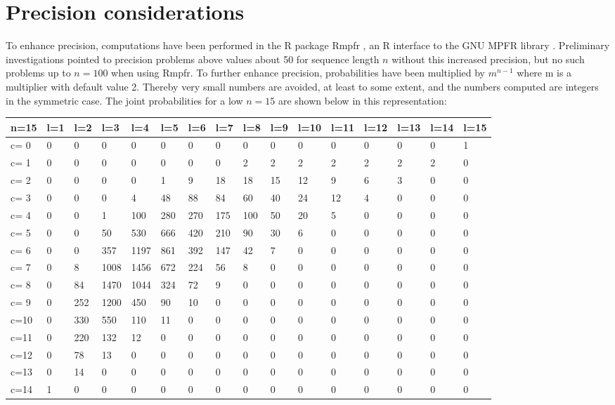 \section{Precision considerations}

To enhance precision, computations have been performed in the R package Rmpfr \citep{Rmpfr}, an R interface to the GNU MPFR library \citep{FouLHLPZ-2007}. Preliminary investigations pointed to precision problems above values about 50 for sequence length $n$ without this increased precision, but no such problems up to $n=100$ when using Rmpfr. To further enhance precision, probabilities have been multiplied by $m^{n-1}$ where m is a multiplier with default value 2. Thereby very small numbers are avoided, at least to some extent, and the numbers computed are integers in the symmetric case. The joint probabilities for a low $n=15$ are shown below in this representation:

\tiny{
\begin{tabular}{l | l l l l l l l l l l l l l l l}
\hline
n=15&l=1&l=2&l=3&l=4&l=5&l=6&l=7&l=8&l=9&l=10&l=11&l=12&l=13&l=14&l=15\\
\hline
c= 0& 0& 0& 0& 0& 0& 0& 0& 0& 0& 0& 0& 0& 0& 0& 1\\
c= 1& 0& 0& 0& 0& 0& 0& 0& 2& 2& 2& 2& 2& 2& 2& 0\\
c= 2& 0& 0& 0& 0& 1& 9& 18& 18& 15& 12& 9& 6& 3& 0& 0\\
c= 3& 0& 0& 0& 4& 48& 88& 84& 60& 40& 24& 12& 4& 0& 0& 0\\
c= 4& 0& 0& 1& 100& 280& 270& 175& 100& 50& 20& 5& 0& 0& 0& 0\\
c= 5& 0& 0& 50& 530& 666& 420& 210& 90& 30& 6& 0& 0& 0& 0& 0\\
c= 6& 0& 0& 357& 1197& 861& 392& 147& 42& 7& 0& 0& 0& 0& 0& 0\\
c= 7& 0& 8& 1008& 1456& 672& 224& 56& 8& 0& 0& 0& 0& 0& 0& 0\\
c= 8& 0& 84& 1470& 1044& 324& 72& 9& 0& 0& 0& 0& 0& 0& 0& 0\\
c= 9& 0& 252& 1200& 450& 90& 10& 0& 0& 0& 0& 0& 0& 0& 0& 0\\
c=10& 0& 330& 550& 110& 11& 0& 0& 0& 0& 0& 0& 0& 0& 0& 0\\
c=11& 0& 220& 132& 12& 0& 0& 0& 0& 0& 0& 0& 0& 0& 0& 0\\
c=12& 0& 78& 13& 0& 0& 0& 0& 0& 0& 0& 0& 0& 0& 0& 0\\
c=13& 0& 14& 0& 0& 0& 0& 0& 0& 0& 0& 0& 0& 0& 0& 0\\
c=14& 1& 0& 0& 0& 0& 0& 0& 0& 0& 0& 0& 0& 0& 0& 0\\
\hline
\end{tabular}
}

